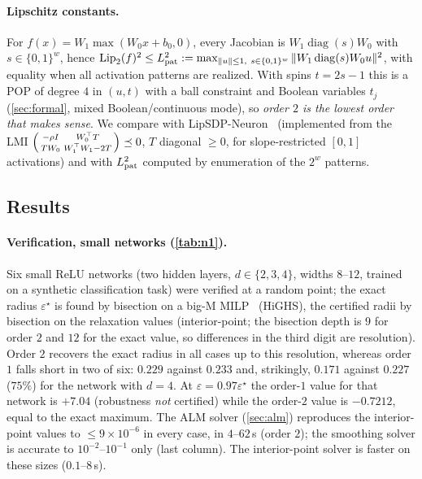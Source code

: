 \documentclass[a4paper,11pt]{article}
\theoremstyle{plain}
\theoremstyle{definition}
\theoremstyle{remark}
\begin{document}
\paragraph{Lipschitz constants.} For $f(x)=W_1\max(W_0x+b_0,0)$, every Jacobian is $W_1\operatorname{diag}(s)W_0$ with $s\in\{0,1\}^w$, hence $\mathrm{Lip}_2(f)^2\le L_{\rm pat}^2:=\max_{\|u\|\le1,\ s\in\{0,1\}^w}\|W_1\operatorname{diag}(s)W_0u\|^2$, with equality when all activation patterns are realized. With spins $t=2s-1$ this is a POP of degree $4$ in $(u,t)$ with a ball constraint and Boolean variables $t_j$ (\cref{sec:formal}, mixed Boolean/continuous mode), so \emph{order $2$ is the lowest order that makes sense}. We compare with LipSDP-Neuron~\cite{fazlyab2019} (implemented from the LMI $\begin{psmallmatrix}-\rho I&W_0^\top T\\TW_0&W_1^\top W_1-2T\end{psmallmatrix}\preceq0$, $T$ diagonal $\ge0$, for slope-restricted $[0,1]$ activations) and with $L_{\rm pat}^2$ computed by enumeration of the $2^w$ patterns.

\subsection{Results}
\paragraph{Verification, small networks (\cref{tab:n1}).} Six small ReLU networks (two hidden layers, $d\in\{2,3,4\}$, widths $8$--$12$, trained on a synthetic classification task) were verified at a random point; the exact radius $\varepsilon^\star$ is found by bisection on a big-M MILP~\cite{tjeng2019} (HiGHS), the certified radii by bisection on the relaxation values (interior-point; the bisection depth is $9$ for order $2$ and $12$ for the exact value, so differences in the third digit are resolution). Order $2$ recovers the exact radius in all cases up to this resolution, whereas order $1$ falls short in two of six: $0.229$ against $0.233$ and, strikingly, $0.171$ against $0.227$ ($75\%$) for the network with $d=4$. At $\varepsilon=0.97\varepsilon^\star$ the order-$1$ value for that network is $+7.04$ (robustness \emph{not} certified) while the order-$2$ value is $-0.7212$, equal to the exact maximum. The ALM solver (\cref{sec:alm}) reproduces the interior-point values to $\le9\times10^{-6}$ in every case, in $4$--$62$\,s (order $2$); the smoothing solver is accurate to $10^{-2}$--$10^{-1}$ only (last column). The interior-point solver is faster on these sizes ($0.1$--$8$\,s).
\begin{table}[t]\centering\scriptsize
\setlength{\tabcolsep}{2.5pt}

\caption{Robustness verification of small networks ($n$ variables after eliminating stable neurons, ``unst.'' unstable neurons). Radii: largest $\varepsilon$ with a negative bound; ``exact'' from MILP. Right block: bound on the maximal margin violation (negative = robust). ``IPM'' = interior point on the same dual (MOSEK), ``ALM'' = our dual augmented Lagrangian, ``smooth.'' = smoothing + L-BFGS.}\label{tab:n1}
\end{table}
\end{document}
